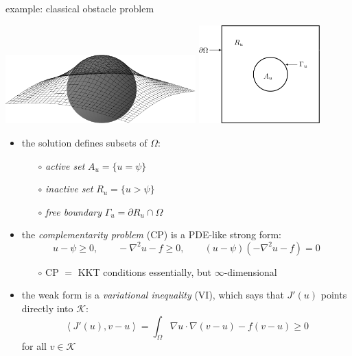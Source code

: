 \documentclass[svgnames,
               hyperref={colorlinks,citecolor=DeepPink4,linkcolor=FireBrick,urlcolor=Maroon},
               usepdftitle=false]  %
               {beamer}
\newcommand{\grad}{\nabla}
\newcommand{\ip}[2]{\left<#1,#2\right>}
\begin{document}
\begin{frame}{example: classical obstacle problem}

\includegraphics[width=0.55\textwidth]{../talk-oxford/images/obstacle65.pdf} \qquad \includegraphics[width=0.35\textwidth]{../talk-oxford/images/obstacle-sets.png}

\bigskip
\begin{itemize}
\item the solution defines subsets of $\Omega$:
   \begin{itemize}
   \item[$\circ$] \emph{active set} $A_u = \{u = \psi\}$
   \item[$\circ$] \emph{inactive set} $R_u = \{u> \psi\}$
   \item[$\circ$] \emph{free boundary} $\Gamma_u=\partial R_u \cap \Omega$
   \end{itemize}
\item the \emph{complementarity problem} (CP) is a PDE-like strong form:
\begin{equation*}
u - \psi \ge 0, \qquad -\grad^2 u - f \ge 0, \qquad (u - \psi)(-\grad^2 u - f) = 0
\end{equation*}

   \begin{itemize}
   \item[$\circ$] CP $=$ KKT conditions essentially, but $\infty$-dimensional
   \end{itemize}
\item the weak form is a {\color{FireBrick} \emph{variational inequality} (VI)}, which says that $J'(u)$ points directly into $\mathcal{K}$:
    $$\ip{J'(u)}{v-u} = \int_\Omega \grad u\cdot \grad (v-u) - f (v-u) \ge 0$$
for all $v \in \mathcal{K}$
\end{itemize}
\end{frame}
\end{document}
